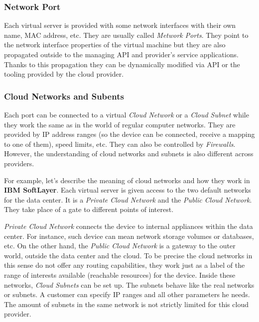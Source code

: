 \subsubsection{Network Port}
\label{subs:Network Port}

Each virtual server is provided with some network interfaces with their own name, MAC address, etc. They are usually called \emph{Metwork Ports}. They point to the network interface properties of the virtual machine but they are also propagated outside to the managing API and provider's service applications. Thanks to this propagation they can be dynamically modified via API or the tooling provided by the cloud provider.

\subsubsection{Cloud Networks and Subents}
\label{subs:Cloud Networks and Subents}

Each port can be connected to a virtual \emph{Cloud Network} or a \emph{Cloud Subnet} while they work the same as in the world of regular computer networks. They are provided by IP address ranges (so the device can be connected, receive a mapping to one of them), speed limits, etc. They can also be controlled by \emph{Firewalls}. However, the understanding of cloud networks and subnets is also different across providers.

For example, let's describe the meaning of cloud networks and how they work in \textbf{IBM SoftLayer}. Each virtual server is given access to the two default networks for the data center. It is a \emph{Private Cloud Network} and the \emph{Public Cloud Network}. They take place of a gate to different points of interest.

\emph{Private Cloud Network} connects the device to internal appliances within the data center. For instance, such device can mean network storage volumes or databases, etc. On the other hand, the \emph{Public Cloud Network} is a gateway to the outer world, outside the data center and the cloud. To be precise the cloud networks in this sense do not offer any routing capabilities, they work just as a label of the range of interests available (reachable resources) for the device. Inside these networks, \emph{Cloud Subnets} can be set up. The subnets behave like the real networks or subnets. A customer can specify IP ranges and all other parameters he needs. The amount of subnets in the same network is not strictly limited for this cloud provider.


